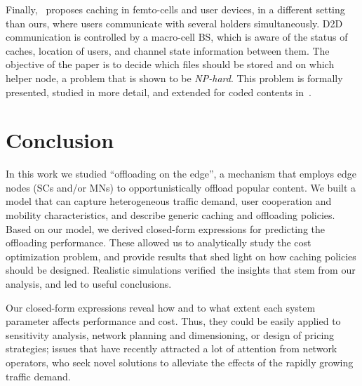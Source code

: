 \documentclass[10pt,conference,letterpaper]{IEEEtran}
\begin{document}
Finally,~\cite{femtocaching-magazine} proposes caching in femto-cells and user devices, in a different setting than ours, where users communicate with several holders simultaneously. D2D communication is controlled by a macro-cell BS, which is aware of the status of caches, location of users, and channel state information between them. The objective of the paper is to decide which files should be stored and on which helper node, a problem that is shown to be \textit{NP-hard}. This problem is formally presented, studied in more detail, and extended for coded contents in~\cite{femtocaching}. 




\section{Conclusion}
In this work we studied ``offloading on the edge'', a mechanism that employs edge nodes (SCs and/or MNs) to opportunistically offload popular content. We built a model that can capture heterogeneous traffic demand, user cooperation and mobility characteristics, and describe generic caching and offloading policies. Based on our model, we derived closed-form expressions for predicting the offloading performance. These allowed us to analytically study the cost optimization problem, and provide results that shed light on how caching policies should be designed. Realistic simulations verified~the insights that stem from our analysis, and led to useful conclusions.

Our closed-form expressions reveal how and to what extent each system parameter affects performance and cost. Thus, they could be easily applied to sensitivity analysis, network planning and dimensioning, or design of pricing strategies; issues that have recently attracted a lot of attention from network operators, who seek novel solutions to alleviate the effects of the rapidly growing traffic demand.
\end{document}
